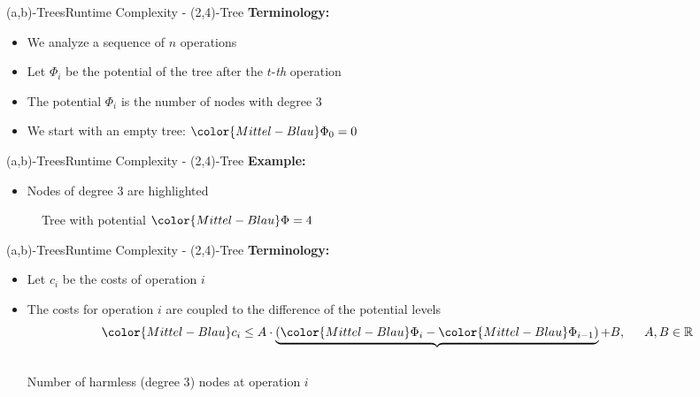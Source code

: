 
\begin{frame}{(a,b)-Trees}{Runtime Complexity - (2,4)-Tree}
  \textbf{Terminology:}
  \begin{itemize}
    \item
      We analyze a sequence of {\color{Mittel-Blau}$n$} operations
    \item
      Let {\color{Mittel-Blau}$\Phi_i$} be the potential of the tree after
      the {\color{Mittel-Blau}$t$}-\textit{th} operation
    \item
      The potential {\color{Mittel-Blau}$\Phi_i$} is the number of nodes
      with {\color{Mittel-Blau}degree 3}
    \item
      We start with an empty tree: ${\color{Mittel-Blau}\Phi_0} = 0$
  \end{itemize}
\end{frame}


\begin{frame}{(a,b)-Trees}{Runtime Complexity - (2,4)-Tree}
  \textbf{Example:}
  \begin{itemize}
    \item
      Nodes of {\color{Mittel-Blau}degree 3} are highlighted
  \end{itemize}
  \begin{figure}[!h]
    \begin{adjustbox}{width=0.8\linewidth}
      
    \end{adjustbox}
    \caption{Tree with potential ${\color{Mittel-Blau}\Phi} = 4$}
    \label{fig:a_b_tree:potential_introduction}
  \end{figure}
\end{frame}


\begin{frame}{(a,b)-Trees}{Runtime Complexity - (2,4)-Tree}
  \textbf{Terminology:}
  \begin{itemize}
    \item
      Let {\color{Mittel-Blau}$c_i$} be the costs of operation
      {\color{Mittel-Blau}$i$}
    \item
      The costs for operation {\color{Mittel-Blau}$i$} are coupled to the
      difference of the potential levels
      \begin{displaymath}
        {\color{Mittel-Blau}c_i} \leq A \cdot \underbrace{(
          {\color{Mittel-Blau}\Phi_i} -
          {\color{Mittel-Blau}\Phi_{i-1}}
        )} + B, \hspace{1.5em} A,B \in \mathbb{R}
      \end{displaymath}\\
      \vspace{-0.75em}
      Number of harmless ({\color{Mittel-Blau}degree 3}) nodes at operation
      {\color{Mittel-Blau}$i$}
  \end{itemize}
\end{frame}

